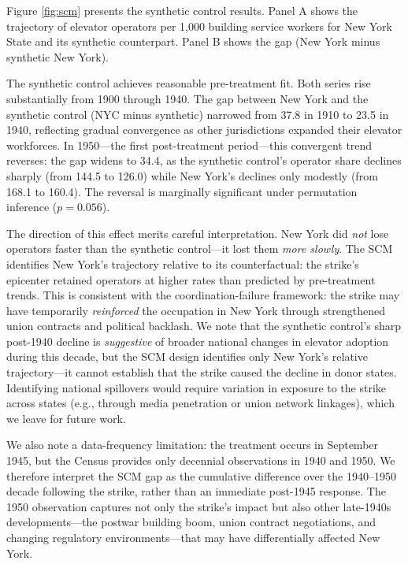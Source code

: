 \documentclass[12pt]{article}
\begin{document}
Figure \ref{fig:scm} presents the synthetic control results. Panel A shows the trajectory of elevator operators per 1,000 building service workers for New York State and its synthetic counterpart. Panel B shows the gap (New York minus synthetic New York).

The synthetic control achieves reasonable pre-treatment fit. Both series rise substantially from 1900 through 1940. The gap between New York and the synthetic control (NYC minus synthetic) narrowed from 37.8 in 1910 to 23.5 in 1940, reflecting gradual convergence as other jurisdictions expanded their elevator workforces. In 1950---the first post-treatment period---this convergent trend reverses: the gap widens to 34.4, as the synthetic control's operator share declines sharply (from 144.5 to 126.0) while New York's declines only modestly (from 168.1 to 160.4). The reversal is marginally significant under permutation inference ($p = 0.056$).

The direction of this effect merits careful interpretation. New York did \textit{not} lose operators faster than the synthetic control---it lost them \textit{more slowly}. The SCM identifies New York's trajectory relative to its counterfactual: the strike's epicenter retained operators at higher rates than predicted by pre-treatment trends. This is consistent with the coordination-failure framework: the strike may have temporarily \textit{reinforced} the occupation in New York through strengthened union contracts and political backlash. We note that the synthetic control's sharp post-1940 decline is \textit{suggestive} of broader national changes in elevator adoption during this decade, but the SCM design identifies only New York's relative trajectory---it cannot establish that the strike caused the decline in donor states. Identifying national spillovers would require variation in exposure to the strike across states (e.g., through media penetration or union network linkages), which we leave for future work.

We also note a data-frequency limitation: the treatment occurs in September 1945, but the Census provides only decennial observations in 1940 and 1950. We therefore interpret the SCM gap as the cumulative difference over the 1940--1950 decade following the strike, rather than an immediate post-1945 response. The 1950 observation captures not only the strike's impact but also other late-1940s developments---the postwar building boom, union contract negotiations, and changing regulatory environments---that may have differentially affected New York.
\end{document}
